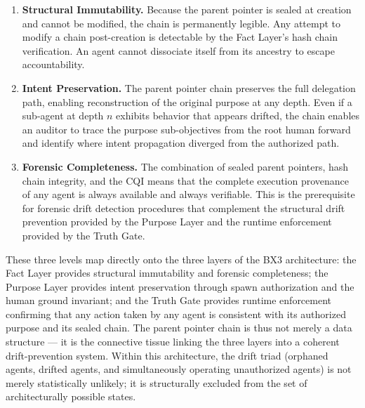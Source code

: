 \begin{enumerate}
    \item \textbf{Structural Immutability.} Because the parent pointer is sealed at creation and cannot be modified, the chain is permanently legible. Any attempt to modify a chain post-creation is detectable by the Fact Layer's hash chain verification. An agent cannot dissociate itself from its ancestry to escape accountability.

    \item \textbf{Intent Preservation.} The parent pointer chain preserves the full delegation path, enabling reconstruction of the original purpose at any depth. Even if a sub-agent at depth $n$ exhibits behavior that appears drifted, the chain enables an auditor to trace the purpose sub-objectives from the root human forward and identify where intent propagation diverged from the authorized path.

    \item \textbf{Forensic Completeness.} The combination of sealed parent pointers, hash chain integrity, and the CQI means that the complete execution provenance of any agent is always available and always verifiable. This is the prerequisite for forensic drift detection procedures that complement the structural drift prevention provided by the Purpose Layer and the runtime enforcement provided by the Truth Gate.
\end{enumerate}

These three levels map directly onto the three layers of the BX3 architecture: the Fact Layer provides structural immutability and forensic completeness; the Purpose Layer provides intent preservation through spawn authorization and the human ground invariant; and the Truth Gate provides runtime enforcement confirming that any action taken by any agent is consistent with its authorized purpose and its sealed chain. The parent pointer chain is thus not merely a data structure --- it is the connective tissue linking the three layers into a coherent drift-prevention system. Within this architecture, the drift triad (orphaned agents, drifted agents, and simultaneously operating unauthorized agents) is not merely statistically unlikely; it is structurally excluded from the set of architecturally possible states.
